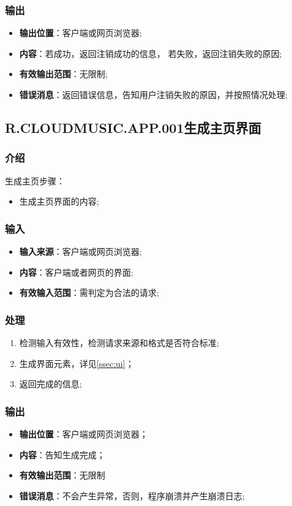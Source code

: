 \subsubsection{输出}
\begin{itemize}
	\item \textbf{输出位置}：客户端或网页浏览器;
	\item \textbf{内容}：若成功，返回注销成功的信息，
		若失败，返回注销失败的原因;
	\item \textbf{有效输出范围}：无限制;
	\item \textbf{错误消息}：返回错误信息，告知用户注销失败的原因，并按照情况处理;
\end{itemize}

\subsection{R.CLOUDMUSIC.APP.001生成主页界面}
\subsubsection{介绍}
生成主页步骤：
	\begin{itemize}
		\item 生成主页界面的内容;
	\end{itemize}
\subsubsection{输入}
	\begin{itemize}
		\item \textbf{输入来源}：客户端或网页浏览器;
		\item \textbf{内容}：客户端或者网页的界面;
		\item \textbf{有效输入范围}：需判定为合法的请求;
	\end{itemize}
\subsubsection{处理}
	\begin{enumerate}
		\item 检测输入有效性，检测请求来源和格式是否符合标准;
		\item 生成界面元素，详见\ref{ssec:ui}；
		\item 返回完成的信息;
	\end{enumerate}
\subsubsection{输出}
\begin{itemize}
	\item \textbf{输出位置}：客户端或网页浏览器；
	\item \textbf{内容}：告知生成完成；
	\item \textbf{有效输出范围}：无限制
	\item \textbf{错误消息}：不会产生异常，否则，程序崩溃并产生崩溃日志;
\end{itemize}

